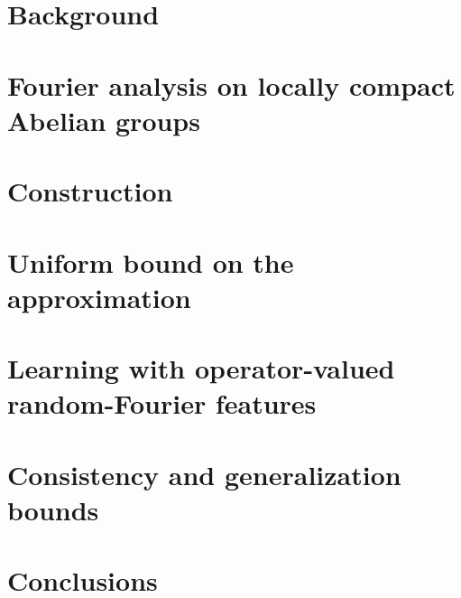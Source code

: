 \section{Background}
\label{sec:ch04_background}

\section{Fourier analysis on locally compact Abelian groups}
\label{sec:fourier_analysis_on_locally_compact_abelian_groups}

\section{Construction}
\label{sec:construction}

\section{Uniform bound on the approximation}
\label{sec:uniform_bound_on_the_approximation}

\section{Learning with operator-valued random-Fourier features}
\label{sec:learning_with_operator-valued_random-fourier_features}

\section{Consistency and generalization bounds}
\label{sec:consistency and generalization bounds}

\section{Conclusions}
\label{sec:conclusions}
